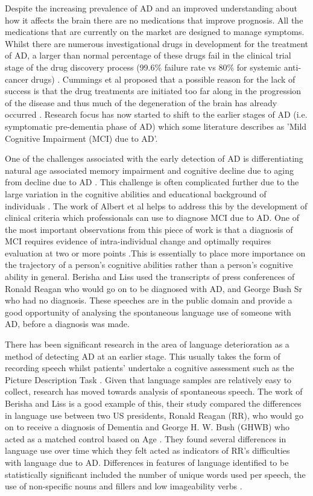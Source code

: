 \documentclass[12pt]{article}
\begin{document}
\par
Despite the increasing prevalence of AD and an improved understanding about how it affects the brain there are no medications that improve prognosis. All the medications that are currently on the market are designed to manage symptoms. Whilst there are numerous investigational drugs in development for the treatment of AD, a larger than normal percentage of these drugs fail in the clinical trial stage of the drug discovery process (99.6\% failure rate vs 80\% for systemic anti-cancer drugs) \cite{Cummings2014}. Cummings et al proposed that a possible reason for the lack of success is that the drug treatments are initiated too far along in the progression of the disease and thus much of the degeneration of the brain has already occurred \cite{Cummings2014}. Research focus has now started to shift to the earlier stages of AD (i.e. symptomatic pre-dementia phase of AD) which some literature describes as 'Mild Cognitive Impairment (MCI) due to AD'.
\par
One of the challenges associated with the early detection of AD is differentiating natural age associated memory impairment and cognitive decline due to aging from decline due to AD \cite{Lo2017}. This challenge is often complicated further due to the large variation in the cognitive abilities and educational background of individuals \cite{Harada2013}. The work of Albert et al helps to address this by the development of clinical criteria which professionals can use to diagnose MCI due to AD. One of the most important observations from this piece of work is that a diagnosis of MCI requires evidence of intra-individual change and optimally requires evaluation at two or more points \cite{Albert2011}.This is essentially to place more importance on the trajectory of a person's cognitive abilities rather than a person's cognitive ability in general. Berisha and Liss used the transcripts of press conferences of Ronald Reagan who would go on to be diagnosed with AD, and George Bush Sr who had no diagnosis. These speeches are in the public domain and provide a good opportunity of analysing the spontaneous language use of someone with AD, before a diagnosis was made. 
\par 
There has been significant research in the area of language deterioration as a method of detecting AD at an earlier stage. This usually takes the form of recording speech whilst patients' undertake a cognitive assessment such as the Picture Description Task \cite{Fraser2015}. Given that language samples are relatively easy to collect, research has moved towards analysis of spontaneous speech. The work of Berisha and Liss is a good example of this, their study compared the differences in language use between two US presidents, Ronald Reagan (RR), who would go on to receive a diagnosis of Dementia and George H. W. Bush (GHWB) who acted as a matched control based on Age \cite{Berisha2015}. They found several differences in language use over time which they felt acted as indicators of RR's difficulties with language due to AD. Differences in features of language identified to be statistically significant included the number of unique words used per speech, the use of non-specific nouns and fillers and low imageability verbs \cite{Berisha2015}. 
\end{document}
